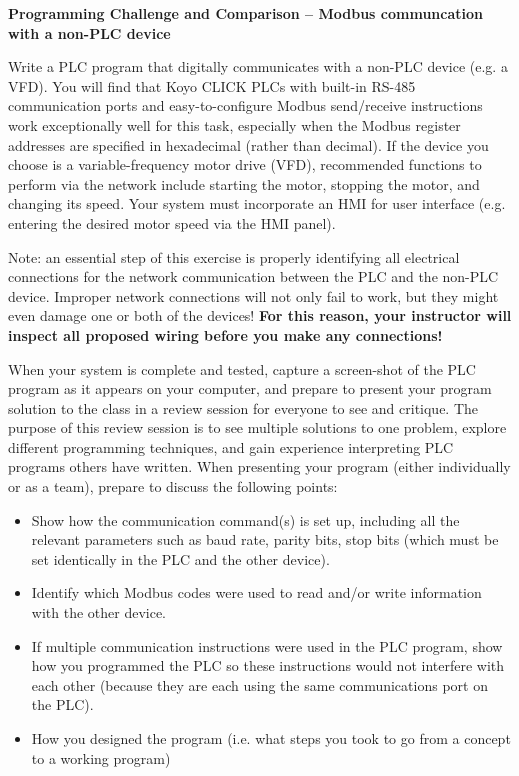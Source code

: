 

\noindent
{\bf Programming Challenge and Comparison -- Modbus communcation with a non-PLC device} 

\vskip 10pt

Write a PLC program that digitally communicates with a non-PLC device (e.g. a VFD).  You will find that Koyo CLICK PLCs with built-in RS-485 communication ports and easy-to-configure Modbus send/receive instructions work exceptionally well for this task, especially when the Modbus register addresses are specified in hexadecimal (rather than decimal).  If the device you choose is a variable-frequency motor drive (VFD), recommended functions to perform via the network include starting the motor, stopping the motor, and changing its speed.  Your system must incorporate an HMI for user interface (e.g. entering the desired motor speed via the HMI panel).

\vskip 10pt

Note: an essential step of this exercise is properly identifying all electrical connections for the network communication between the PLC and the non-PLC device.  Improper network connections will not only fail to work, but they might even damage one or both of the devices!  {\bf For this reason, your instructor will inspect all proposed wiring before you make any connections!}

\vskip 10pt

When your system is complete and tested, capture a screen-shot of the PLC program as it appears on your computer, and prepare to present your program solution to the class in a review session for everyone to see and critique.  The purpose of this review session is to see multiple solutions to one problem, explore different programming techniques, and gain experience interpreting PLC programs others have written.  When presenting your program (either individually or as a team), prepare to discuss the following points:

\begin{itemize}
\item{} Show how the communication command(s) is set up, including all the relevant parameters such as baud rate, parity bits, stop bits (which must be set identically in the PLC and the other device).
\item{} Identify which Modbus codes were used to read and/or write information with the other device.
\item{} If multiple communication instructions were used in the PLC program, show how you programmed the PLC so these instructions would not interfere with each other (because they are each using the same communications port on the PLC).
\item{} How you designed the program (i.e. what steps you took to go from a concept to a working program)
\end{itemize}


